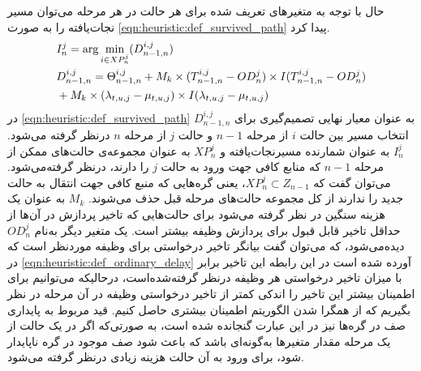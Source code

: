 	حال با توجه به متغیرهای تعریف شده برای هر حالت در هر مرحله می‌توان مسیر نجات‌یافته را به صورت \cref{eqn:heuristic:def_survived_path} پیدا کرد. 
	\begin{align}\label{eqn:heuristic:def_survived_path}
		&I_n^j = \arg \min_{i \in XP_n^j} (D_{n-1,n}^{i,j}) \\
		&D_{n-1,n}^{i,j} = \Theta_{n-1,n}^{i,j} + M_k \times (T_{n-1,n}^{i,j} - OD_n^j) \times I(T_{n-1,n}^{i,j} - OD_n^j) \notag \\
		&+M_k \times (\lambda_{t,u,j} - \mu_{t,u,j}) \times I(\lambda_{t,u,j} - \mu_{t,u,j})
	\end{align}	
در \cref{eqn:heuristic:def_survived_path} $D_{n-1,n}^{i,j}$ به عنوان معیار نهایی تصمیم‌گیری برای انتخاب مسیر بین حالت $i$ از مرحله $n-1$ و حالت $j$ از مرحله $n$ درنظر گرفته می‌شود. $I_n^j$ به عنوان شمارنده مسیرنجات‌یافته و $XP_n^j$ به عنوان مجموعه‌ی حالت‌های ممکن از مرحله $n-1$ که منابع کافی جهت ورود به حالت $j$ را دارند، درنظر گرفته‌می‌شود. می‌توان گفت که $XP_n^j \subset Z_{n-1}$، یعنی گره‌هایی که منبع کافی جهت انتقال به حالت جدید را ندارند از کل مجموعه حالت‌های مرحله قبل حذف می‌شوند. $M_k$ به عنوان یک هزینه سنگین در نظر گرفته می‌شود برای حالت‌هایی که تاخیر پردازش در آن‌ها از حداقل تاخیر قابل قبول برای پردازش وظیفه بیشتر است. یک متغیر دیگر به‌نام $OD_n^j$ دیده‌می‌شود، که می‌توان گفت بیانگر تاخیر درخواستی برای وظیفه موردنظر است که در \cref{eqn:heuristic:def_ordinary_delay} آورده شده است در این رابطه این تاخیر برابر با میزان تاخیر درخواستی هر وظیفه درنظر گرفته‌شده‌است، درحالیکه می‌توانیم برای اطمینان بیشتر این تاخیر را اندکی کمتر از تاخیر درخواستی وظیفه در آن مرحله در نظر بگیریم که از همگرا شدن الگوریتم اطمینان بیشتری حاصل کنیم. قید مربوط به پایداری صف در گره‌ها نیز در این عبارت گنجانده شده است، به صورتی‌که اگر در یک حالت از یک مرحله مقدار متغیرها به‌گونه‌ای باشد که باعث شود صف موجود در گره ناپایدار شود، برای ورود به آن حالت هزینه زیادی درنظر گرفته می‌شود.

